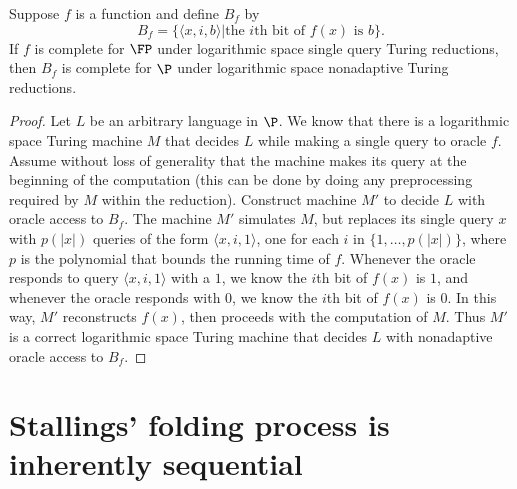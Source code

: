 \documentclass{article}
\begin{document}
\begin{lemma}\label{lem:nonadaptive}
  Suppose $f$ is a function and define $B_f$ by
  \begin{equation*}
    B_f = \{ \langle x, i, b \rangle | \text{the } i \text{th bit of } f(x) \text{ is } b \}.
  \end{equation*}
  If $f$ is complete for $\FP$ under logarithmic space single query Turing reductions, then $B_f$ is complete for $\P$ under logarithmic space nonadaptive Turing reductions.
\end{lemma}
\begin{proof}
  Let $L$ be an arbitrary language in $\P$.
  We know that there is a logarithmic space Turing machine $M$ that decides $L$ while making a single query to oracle $f$.
  Assume without loss of generality that the machine makes its query at the beginning of the computation (this can be done by doing any preprocessing required by $M$ within the reduction).
  Construct machine $M'$ to decide $L$ with oracle access to $B_f$.
  The machine $M'$ simulates $M$, but replaces its single query $x$ with $p(|x|)$ queries of the form $\langle x, i, 1 \rangle$, one for each $i$ in $\{1, \dotsc, p(|x|) \}$, where $p$ is the polynomial that bounds the running time of $f$.
  Whenever the oracle responds to query $\langle x, i, 1 \rangle$ with a $1$, we know the $i$th bit of $f(x)$ is $1$, and whenever the oracle responds with $0$, we know the $i$th bit of $f(x)$ is $0$.
  In this way, $M'$ reconstructs $f(x)$, then proceeds with the computation of $M$.
  Thus $M'$ is a correct logarithmic space Turing machine that decides $L$ with nonadaptive oracle access to $B_f$.
\end{proof}

\section{Stallings' folding process is inherently sequential}



%
\end{document}
